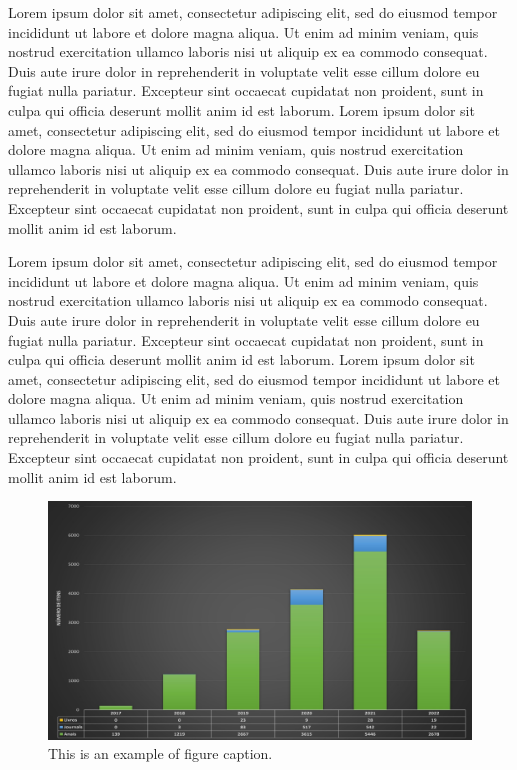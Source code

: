 \documentclass[english]{sbc2025}%
\begin{document}
Lorem ipsum dolor sit amet, consectetur adipiscing elit, sed do eiusmod tempor incididunt ut labore et dolore magna aliqua. Ut enim ad minim veniam, quis nostrud exercitation ullamco laboris nisi ut aliquip ex ea commodo consequat. Duis aute irure dolor in reprehenderit in voluptate velit esse cillum dolore eu fugiat nulla pariatur. Excepteur sint occaecat cupidatat non proident, sunt in culpa qui officia deserunt mollit anim id est laborum. Lorem ipsum dolor sit amet, consectetur adipiscing elit, sed do eiusmod tempor incididunt ut labore et dolore magna aliqua. Ut enim ad minim veniam, quis nostrud exercitation ullamco laboris nisi ut aliquip ex ea commodo consequat. Duis aute irure dolor in reprehenderit in voluptate velit esse cillum dolore eu fugiat nulla pariatur. Excepteur sint occaecat cupidatat non proident, sunt in culpa qui officia deserunt mollit anim id est laborum.

Lorem ipsum dolor sit amet, consectetur adipiscing elit, sed do eiusmod tempor incididunt ut labore et dolore magna aliqua. Ut enim ad minim veniam, quis nostrud exercitation ullamco laboris nisi ut aliquip ex ea commodo consequat. Duis aute irure dolor in reprehenderit in voluptate velit esse cillum dolore eu fugiat nulla pariatur. Excepteur sint occaecat cupidatat non proident, sunt in culpa qui officia deserunt mollit anim id est laborum. Lorem ipsum dolor sit amet, consectetur adipiscing elit, sed do eiusmod tempor incididunt ut labore et dolore magna aliqua. Ut enim ad minim veniam, quis nostrud exercitation ullamco laboris nisi ut aliquip ex ea commodo consequat. Duis aute irure dolor in reprehenderit in voluptate velit esse cillum dolore eu fugiat nulla pariatur. Excepteur sint occaecat cupidatat non proident, sunt in culpa qui officia deserunt mollit anim id est laborum.

\begin{figure}
\begin{center}
\includegraphics[width=\columnwidth]{sol.jpg}
\caption{This is an example of figure caption.}\label{Fig1}
\end{center}
\end{figure}
\end{document}
